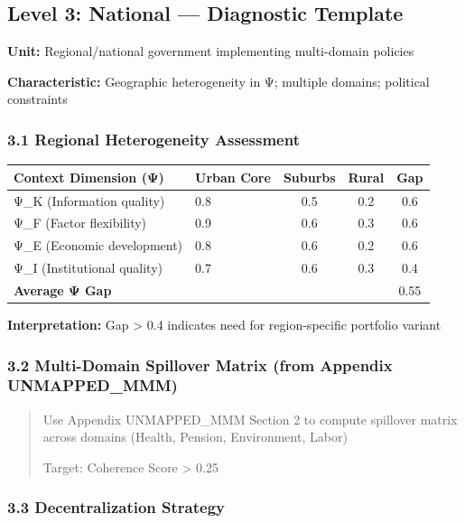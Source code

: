 \subsection*{Level 3: National --- Diagnostic Template}

\textbf{Unit:} Regional/national government implementing multi-domain policies

\textbf{Characteristic:} Geographic heterogeneity in Ψ; multiple domains; political constraints

\subsubsection*{3.1 Regional Heterogeneity Assessment}

\begin{center}
\small
\begin{tabular}{@{}llccc@{}}
\toprule
\textbf{Context Dimension (Ψ)} & \textbf{Urban Core} & \textbf{Suburbs} & \textbf{Rural} & \textbf{Gap} \\
\midrule
Ψ\_K (Information quality) & 0.8 & 0.5 & 0.2 & 0.6 \\
Ψ\_F (Factor flexibility) & 0.9 & 0.6 & 0.3 & 0.6 \\
Ψ\_E (Economic development) & 0.8 & 0.6 & 0.2 & 0.6 \\
Ψ\_I (Institutional quality) & 0.7 & 0.6 & 0.3 & 0.4 \\
\midrule
\textbf{Average Ψ Gap} & & & & 0.55 \\
\midrule
\end{tabular}
\end{center}

\textbf{Interpretation:} Gap > 0.4 indicates need for region-specific portfolio variant

\subsubsection*{3.2 Multi-Domain Spillover Matrix (from Appendix UNMAPPED_MMM)}

\begin{quote}
Use Appendix UNMAPPED_MMM Section 2 to compute spillover matrix across domains (Health, Pension, Environment, Labor)

Target: Coherence Score > 0.25
\end{quote}

\subsubsection*{3.3 Decentralization Strategy}

